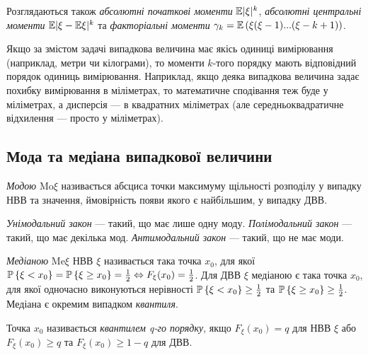 Розглядаються також \emph{абсолютні початкові моменти} $\E\vert \xi \vert ^k$, \emph{абсолютні центральні моменти} $\E\vert \xi - \E\xi \vert ^k$
та \emph{факторіальні моменти} $\gamma_k = \E\left( \xi (\xi - 1) ... (\xi - k + 1)\right)$.
\begin{remark}
    Якщо за змістом задачі випадкова величина має якісь одиниці вимірювання (наприклад, метри чи кілограми),
    то моменти $k$-того порядку мають відповідний порядок одиниць вимірювання.
    Наприклад, якщо деяка випадкова величина задає похибку вимірювання в міліметрах,
    то математичне сподівання теж буде у міліметрах, а дисперсія --- в квадратних міліметрах
    (але середньоквадратичне відхилення --- просто у міліметрах).
\end{remark}


\subsection{Мода та медіана випадкової величини}
\begin{definition}
    \emph{Модою} $\mathrm{Mo}\xi$ називається абсциса точки максимуму щільності 
    розподілу у випадку НВВ та значення, ймовірність 
    появи якого є найбільшим, у випадку ДВВ.

    \emph{Унімодальний закон} --- такий, що має лише одну моду. 
    \emph{Полімодальний закон} --- такий, що має декілька мод.
    \emph{Антимодальний закон} --- такий, що не має моди.
\end{definition}
\begin{definition}
    \emph{Медіаною} $\mathrm{Me}\xi$ НВВ $\xi$ називається така точка $x_0$, для якої 
    $\P\left\{\xi < x_0\right\} = \P\left\{\xi \geq x_0\right\} 
    = \frac{1}{2} \Leftrightarrow F_\xi(x_0) = \frac{1}{2}$.
    Для ДВВ $\xi$ медіаною є така точка $x_0$, для якої одночасно
    виконуються нерівності $\P\left\{\xi < x_0\right\} \geq \frac{1}{2}$ та
    $\P\left\{\xi \geq x_0\right\} \geq \frac{1}{2}$.
    Медіана є окремим випадком \emph{квантиля}.
\end{definition}
\begin{definition}
    Точка $x_0$ називається \emph{квантилем q-го порядку}, якщо $F_\xi(x_0) = q$ 
    для НВВ $\xi$ або $F_\xi(x_0) \geq q$ та $F_\xi(x_0) \geq 1-q$ для ДВВ.
\end{definition}
